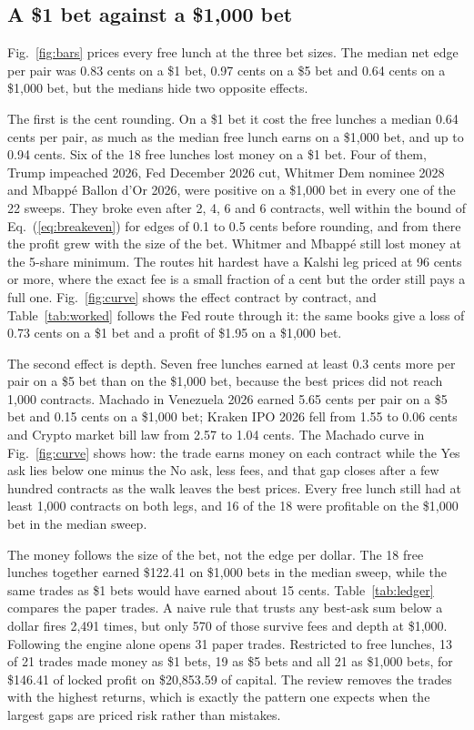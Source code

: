 \documentclass[5p,letterpaper]{elsarticle}
\begin{document}
\subsection{A \$1 bet against a \$1,000 bet}\label{sec:betsize}

Fig.~\ref{fig:bars} prices every free lunch at the three bet sizes. The median net edge per pair was 0.83 cents on a \$1 bet, 0.97 cents on a \$5 bet and 0.64 cents on a \$1,000 bet, but the medians hide two opposite effects.

The first is the cent rounding. On a \$1 bet it cost the free lunches a median 0.64 cents per pair, as much as the median free lunch earns on a \$1,000 bet, and up to 0.94 cents. Six of the 18 free lunches lost money on a \$1 bet. Four of them, Trump impeached 2026, Fed December 2026 cut, Whitmer Dem nominee 2028 and Mbapp\'e Ballon d'Or 2026, were positive on a \$1,000 bet in every one of the 22 sweeps. They broke even after 2, 4, 6 and 6 contracts, well within the bound of Eq.~(\ref{eq:breakeven}) for edges of 0.1 to 0.5 cents before rounding, and from there the profit grew with the size of the bet. Whitmer and Mbapp\'e still lost money at the 5-share minimum. The routes hit hardest have a Kalshi leg priced at 96 cents or more, where the exact fee is a small fraction of a cent but the order still pays a full one. Fig.~\ref{fig:curve} shows the effect contract by contract, and Table~\ref{tab:worked} follows the Fed route through it: the same books give a loss of 0.73 cents on a \$1 bet and a profit of \$1.95 on a \$1,000 bet.

The second effect is depth. Seven free lunches earned at least 0.3 cents more per pair on a \$5 bet than on the \$1,000 bet, because the best prices did not reach 1,000 contracts. Machado in Venezuela 2026 earned 5.65 cents per pair on a \$5 bet and 0.15 cents on a \$1,000 bet; Kraken IPO 2026 fell from 1.55 to 0.06 cents and Crypto market bill law from 2.57 to 1.04 cents. The Machado curve in Fig.~\ref{fig:curve} shows how: the trade earns money on each contract while the Yes ask lies below one minus the No ask, less fees, and that gap closes after a few hundred contracts as the walk leaves the best prices. Every free lunch still had at least 1,000 contracts on both legs, and 16 of the 18 were profitable on the \$1,000 bet in the median sweep.

The money follows the size of the bet, not the edge per dollar. The 18 free lunches together earned \$122.41 on \$1,000 bets in the median sweep, while the same trades as \$1 bets would have earned about 15 cents. Table~\ref{tab:ledger} compares the paper trades. A naive rule that trusts any best-ask sum below a dollar fires 2,491 times, but only 570 of those survive fees and depth at \$1,000. Following the engine alone opens 31 paper trades. Restricted to free lunches, 13 of 21 trades made money as \$1 bets, 19 as \$5 bets and all 21 as \$1,000 bets, for \$146.41 of locked profit on \$20,853.59 of capital. The review removes the trades with the highest returns, which is exactly the pattern one expects when the largest gaps are priced risk rather than mistakes.
\end{document}

